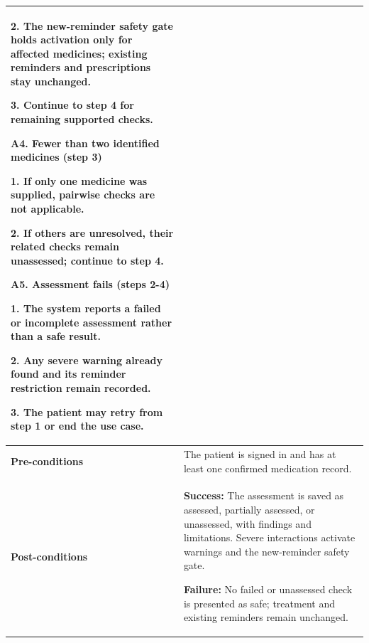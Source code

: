 \begin{longtable}{|p{}|p{}|}
2. The new-reminder safety gate holds activation only for affected medicines; existing reminders and prescriptions stay unchanged.\par
3. Continue to step 4 for remaining supported checks.
\par\smallskip
\textbf{A4. Fewer than two identified medicines (step 3)}\par
1. If only one medicine was supplied, pairwise checks are not applicable.\par
2. If others are unresolved, their related checks remain unassessed; continue to step 4.
\par\smallskip
\textbf{A5. Assessment fails (steps 2-4)}\par
1. The system reports a failed or incomplete assessment rather than a safe result.\par
2. Any severe warning already found and its reminder restriction remain recorded.\par
3. The patient may retry from step 1 or end the use case.
\\ \hline
\textbf{Pre-conditions} & The patient is signed in and has at least one confirmed medication record. \\ \hline
\textbf{Post-conditions} & \textbf{Success:} The assessment is saved as assessed, partially assessed, or unassessed, with findings and limitations. Severe interactions activate warnings and the new-reminder safety gate.\par
\textbf{Failure:} No failed or unassessed check is presented as safe; treatment and existing reminders remain unchanged. \\ \hline
\end{longtable}

\clearpage
